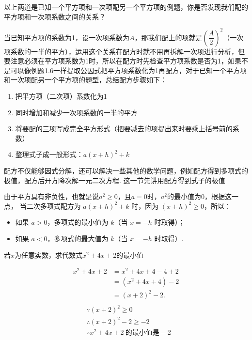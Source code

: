 \documentclass[lang=cn, 10pt, titlestyle=display, oneside, toc=twocol]{elegantbook}
\begin{document}
以上两道是已知一个平方项和一次项配另一个平方项的例题，你是否发现我们配的平方项和一次项系数之间的关系？
\par
当已知平方项的系数为1，设一次项系数为\(A\)，那我们配上的项就是\((\dfrac{A}{2})^2\)（一次项系数的一半的平方），运用这个关系在配方时就不用再拆解一次项进行分析，但要注意必须在平方项系数为1时，所以在配方时先检查平方项系数是否为1，如果不是可以像例题1.6一样提取公因式把平方项系数化为1再配方，对于已知一个平方项和一次项配另一个平方项的题型，总结配方步骤如下：
\begin{enumerate}
    \item 把平方项（二次项）系数化为1
    \item 同时增加和减少一次项系数的一半的平方
    \item 将要配的三项写成完全平方形式（把要减去的项提出来时要乘上括号前的系数）
    \item 整理式子成一般形式：\( a(x + h)^2 + k \)
\end{enumerate}
\par
配方不仅能够因式分解，还可以解决一些其他的数学问题，例如配方得到多项式的极值，配方后开方降次解一元二次方程. 这一节先讲用配方得到式子的极值
\par
由于平方具有非负性，也就是说\(a^2\geq0\)，且\(a=0\)时，\(a^2\)的最小值为0，根据这一点，
当二次多项式配方为 \( a(x + h)^2 + k \) 时，因为 \( (x + h)^2 \geq 0 \)，所以：
\newline
\begin{itemize}[label=]
    \item 如果 \( a > 0 \)，多项式的最小值为 \( k \)（当 \( x = -h \) 时取得）；
    \item 如果 \( a < 0 \)，多项式的最大值为 \( k \)（当 \( x = -h \) 时取得）.
\end{itemize}

\begin{example}
若\(x\)为任意实数，求代数式\(x^2+4x+2\)的最小值
\end{example}

\begin{solution}

\begin{align*}
x^2 + 4x + 2 &= x^2 + 4x + 4 - 4 + 2 \\
&= (x^2 + 4x + 4) - 2 \\
&= (x + 2)^2 - 2.\\
\end{align*}
\begin{align*}
&\because (x + 2)^2 \geq 0\\
&\therefore (x + 2)^2-2 \geq -2\\
&\therefore x^2 + 4x + 2 \  \text{的最小值是}-2
\end{align*}
\end{solution}
\end{document}
